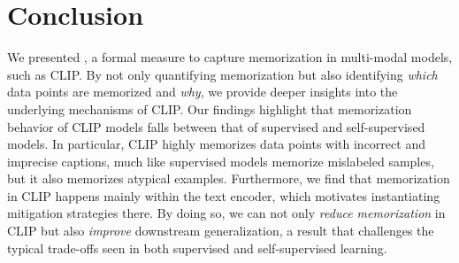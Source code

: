 \section{Conclusion}
We presented \ours, a formal measure to capture memorization in multi-modal models, such as CLIP.
By not only quantifying memorization but also identifying \textit{which} data points are memorized and \textit{why}, we provide deeper insights into the underlying mechanisms of CLIP.
Our findings highlight that memorization behavior of CLIP models falls between that of supervised and self-supervised models.
In particular, CLIP highly memorizes data points with incorrect and imprecise captions, much like supervised models memorize mislabeled samples, but it also memorizes atypical examples.
Furthermore, we find that memorization in CLIP happens mainly within the text encoder, which motivates instantiating mitigation strategies there.
By doing so, we can not only \textit{reduce memorization} in CLIP but also \textit{improve} downstream generalization, a result that challenges the typical trade-offs seen in both supervised and self-supervised learning.



